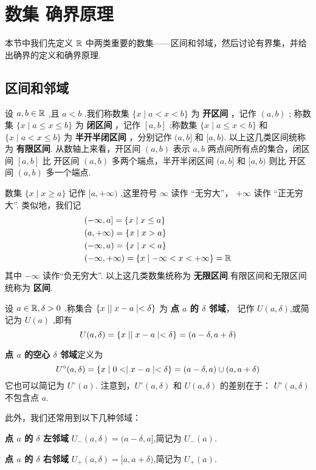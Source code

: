 \section{数集 \textbullet 确界原理}

本节中我们先定义 $\mathbb{R}$ 中两类重要的数集——区间和邻域，然后讨论有界集，并给出确界的定义和确界原理.

\subsection{区间和邻域}

设 $a,b\in \mathbb{R}$ ,且 $a<b$ .我们称数集 $\{x\mid a<x<b\}$ 为 \textbf{开区间} ，记作 $(a,b)$ ; 称数集 $\{x\mid a\le x \le b\}$ 为 \textbf{闭区间} ，记作 $[a,b]$ ;称数集 $\{x\mid a\le x < b\}$ 和 $\{x\mid a< x \le b\}$ 为 \textbf{半开半闭区间} ，分别记作 $(a,b]$ 和 $[a,b)$. 以上这几类区间统称为 \textbf{有限区间}. 从数轴上来看，开区间 $(a,b)$ 表示 $a,b$ 两点间所有点的集合，闭区间 $[a,b]$ 比 开区间 $(a,b)$ 多两个端点，半开半闭区间 $(a,b]$ 和 $[a,b)$ 则比 开区间 $(a,b)$ 多一个端点.

数集 $\{x\mid x\ge a\}$ 记作 $[a,+\infty)$ ,这里符号 $\infty$ 读作 “无穷大”， $+\infty$ 读作 “正无穷大”. 类似地，我们记
\begin{align*}
    &(-\infty,a] = \{x \mid x \le a\} \\
    &(a,+\infty) = \{x \mid x > a\} \\
    &(-\infty,a) = \{x \mid x < a\} \\
    &(-\infty,+\infty) = \{x \mid -\infty < x < +\infty\} = \mathbb{R}
\end{align*}
其中 $-\infty$ 读作“负无穷大”. 以上这几类数集统称为 \textbf{无限区间}.有限区间和无限区间统称为 \textbf{区间}.

设 $a\in \mathbb{R},\delta>0$ .称集合 $\{x \mid \mid x-a \mid<\delta\}$ 为 \textbf{点 $a$ 的 $\delta$ 邻域}， 记作 $U(a,\delta)$,或简记为 $U(a)$ ,即有
\[
U(a,\delta) = \{x \mid \mid x-a \mid<\delta\} = (a-\delta,a+\delta)
\]

\textbf{点 $a$ 的空心 $\delta$ 邻域}定义为 
\[
U^\circ(a,\delta) = \{x \mid 0< \mid x-a \mid<\delta\} = (a-\delta,a) \cup (a,a+\delta)
\]
它也可以简记为 $U^\circ(a)$. 注意到，$U^\circ(a,\delta)$ 和 $U(a,\delta)$ 的差别在于： $U^\circ(a,\delta)$ 不包含点 $a$.

此外，我们还常用到以下几种邻域：

\textbf{点 $a$ 的 $\delta$ 左邻域} $U_-(a,\delta)=(a-\delta,a]$,简记为 $U_-(a)$.

\textbf{点 $a$ 的 $\delta$ 右邻域} $U_+(a,\delta)=[a,a+\delta)$,简记为 $U_+(a)$.

